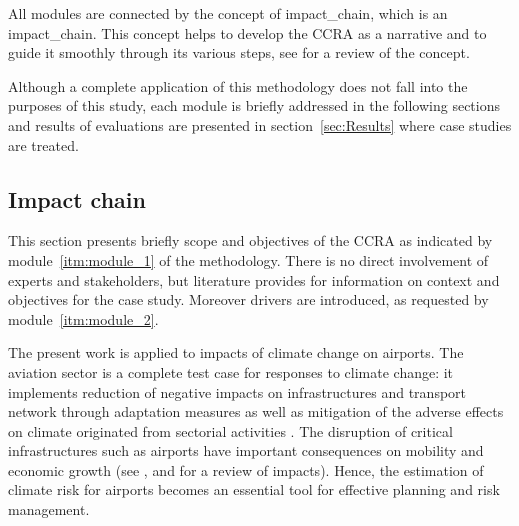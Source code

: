 All modules are connected by the concept of \gls{impact_chain}, which is an \glsdesc{impact_chain}. This concept helps to develop the \gls{CCRA} as a narrative and to guide it smoothly through its various steps, see \cite[217-224]{2022KondrupClimateAdaptation} for a review of the concept.

Although a complete application of this methodology does not fall into the purposes of this study, each module is briefly addressed in the following sections and results of evaluations are presented in section~\ref{sec:Results} where case studies are treated.



\subsection{Impact chain}
\label{sec:Impact chain}
This section presents briefly scope and objectives of the \gls{CCRA} as indicated by module~\ref{itm:module_1} of the methodology. There is no direct involvement of experts and stakeholders, but literature provides for information on context and objectives for the case study. Moreover \glspl{driver} are introduced, as requested by module~\ref{itm:module_2}.

The present work is applied to impacts of climate change on airports.
The aviation sector is a complete test case for responses to climate change: it implements reduction of negative \glspl{impact} on infrastructures and transport network through adaptation measures as well as mitigation of the adverse effects on climate originated from sectorial activities \cite{2022ICAOICAOEnvironmental}. The disruption of critical infrastructures such as airports have important consequences on mobility and economic growth (see \cite{2018ICAOClimateAdaptation}, \cite[15]{2016BurbidgeAdaptingEuropean} and \cite[548]{2022DeVivoRiskAssessment} for a review of impacts). Hence, the estimation of climate \gls{risk} for airports becomes an essential tool for effective planning and risk management.


